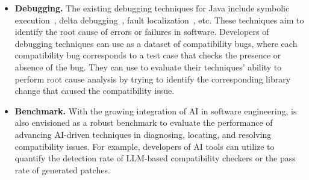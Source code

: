 \begin{itemize}[leftmargin=*,topsep=2pt]
    \item \textbf{Debugging.}  The existing debugging techniques for
      Java include symbolic execution~\cite{baldoni2018survey}, delta
      debugging~\cite{zeller1999yesterday}, fault localization~\cite{wong2016survey}, etc. These techniques aim to identify the root
      cause of errors or failures in software. Developers of debugging
      techniques can use \toolcompsuite as a dataset of compatibility bugs,
      where each compatibility bug corresponds to a test case that
      checks the presence or absence of the bug. They can use \toolcompsuite to
      evaluate their techniques' ability to perform root cause
      analysis by trying to identify the corresponding library change
      that caused the compatibility issue.

    \item \textbf{Benchmark.} With the growing integration of AI in software engineering, \toolcompsuite is also envisioned as a robust benchmark to evaluate the performance of advancing AI-driven techniques in diagnosing, locating, and resolving compatibility issues. For example, developers of AI tools can utilize \toolcompsuite to quantify the detection rate of LLM-based compatibility checkers or the pass rate of generated patches.
\end{itemize}
